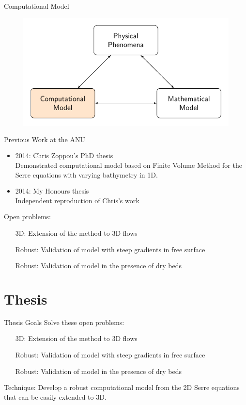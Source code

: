 \documentclass[pdf]{beamer}
\begin{document}
\begin{frame}{Computational Model}
	\begin{figure}
		\includegraphics[width=\textwidth]{./Pics/ModelDiagrams/FlowChartHigh3O.pdf}
	\end{figure}
\end{frame}
\begin{frame}{Previous Work at the ANU}
	\begin{itemize}
		\item 2014: Chris Zoppou's PhD thesis  \\
			Demonstrated computational model based on Finite Volume Method for the Serre equations with varying bathymetry in 1D.
		\item 2014: My Honours thesis \\
			Independent reproduction of Chris's work
	\end{itemize}
	Open problems:
	\begin{itemize}
		\item[3D:] Extension of the method to 3D flows
		\item[Robust:] Validation of model with steep gradients in free surface
		\item[Robust:] Validation of model in the presence of dry beds
	\end{itemize}	
\end{frame}



\section{Thesis}

\begin{frame}{Thesis Goals}
	Solve these open problems:
	\begin{itemize}
		\item[3D:] Extension of the method to 3D flows
		\item[Robust:] Validation of model with steep gradients in free surface
		\item[Robust:] Validation of model in the presence of dry beds
	\end{itemize}		
	\medskip
	\pause
	Technique: Develop a robust computational model from the 2D Serre equations that can be easily extended to 3D. 
\end{frame}
\end{document}
